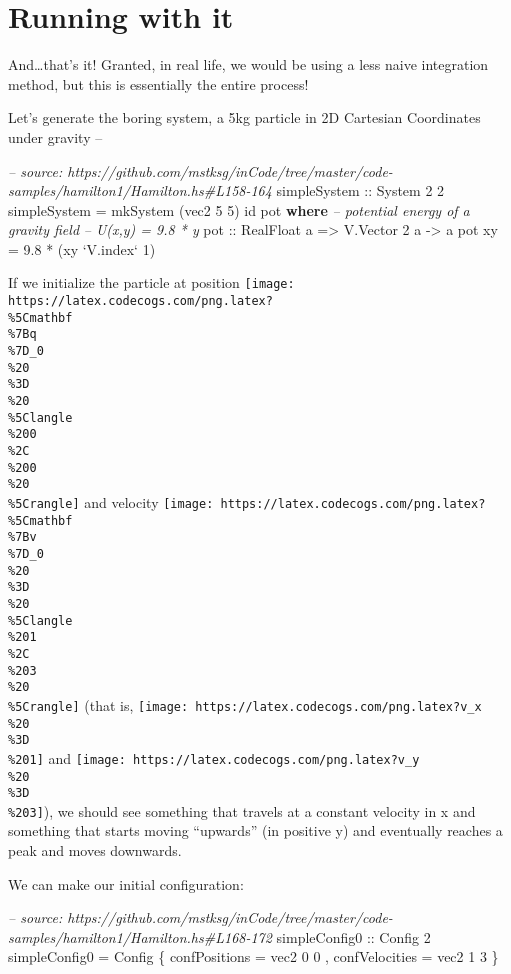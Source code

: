 \documentclass[]{article}
\newenvironment{Shaded}{}{}
\newcommand{\KeywordTok}[1]{\textcolor[rgb]{0.00,0.44,0.13}{\textbf{#1}}}
\newcommand{\DataTypeTok}[1]{\textcolor[rgb]{0.56,0.13,0.00}{#1}}
\newcommand{\DecValTok}[1]{\textcolor[rgb]{0.25,0.63,0.44}{#1}}
\newcommand{\FloatTok}[1]{\textcolor[rgb]{0.25,0.63,0.44}{#1}}
\newcommand{\CommentTok}[1]{\textcolor[rgb]{0.38,0.63,0.69}{\textit{#1}}}
\newcommand{\OtherTok}[1]{\textcolor[rgb]{0.00,0.44,0.13}{#1}}
\newcommand{\FunctionTok}[1]{\textcolor[rgb]{0.02,0.16,0.49}{#1}}
\newcommand{\NormalTok}[1]{#1}
\begin{document}
\section{Running with it}\label{running-with-it}

And\ldots{}that's it! Granted, in real life, we would be using a less naive
integration method, but this is essentially the entire process!

Let's generate the boring system, a 5kg particle in 2D Cartesian Coordinates
under gravity --

\begin{Shaded}
\begin{Highlighting}[]
\CommentTok{-- source: https://github.com/mstksg/inCode/tree/master/code-samples/hamilton1/Hamilton.hs#L158-164}
\OtherTok{simpleSystem ::} \DataTypeTok{System} \DecValTok{2} \DecValTok{2}
\NormalTok{simpleSystem }\FunctionTok{=}\NormalTok{ mkSystem (vec2 }\DecValTok{5} \DecValTok{5}\NormalTok{) id pot}
  \KeywordTok{where}
    \CommentTok{-- potential energy of a gravity field}
    \CommentTok{-- U(x,y) = 9.8 * y}
\OtherTok{    pot ::} \DataTypeTok{RealFloat}\NormalTok{ a }\OtherTok{=>} \DataTypeTok{V.Vector} \DecValTok{2}\NormalTok{ a }\OtherTok{->}\NormalTok{ a}
\NormalTok{    pot xy }\FunctionTok{=} \FloatTok{9.8} \FunctionTok{*}\NormalTok{ (xy }\OtherTok{`V.index`} \DecValTok{1}\NormalTok{)}
\end{Highlighting}
\end{Shaded}

If we initialize the particle at position
\texttt{[image: https://latex.codecogs.com/png.latex?\\\%5Cmathbf\\\%7Bq\\\%7D\_0\\\%20\\\%3D\\\%20\\\%5Clangle\\\%200\\\%2C\\\%200\\\%20\\\%5Crangle]}
and velocity
\texttt{[image: https://latex.codecogs.com/png.latex?\\\%5Cmathbf\\\%7Bv\\\%7D\_0\\\%20\\\%3D\\\%20\\\%5Clangle\\\%201\\\%2C\\\%203\\\%20\\\%5Crangle]}
(that is,
\texttt{[image: https://latex.codecogs.com/png.latex?v\_x\\\%20\\\%3D\\\%201]} and
\texttt{[image: https://latex.codecogs.com/png.latex?v\_y\\\%20\\\%3D\\\%203]}), we
should see something that travels at a constant velocity in x and something that
starts moving ``upwards'' (in positive y) and eventually reaches a peak and
moves downwards.

We can make our initial configuration:

\begin{Shaded}
\begin{Highlighting}[]
\CommentTok{-- source: https://github.com/mstksg/inCode/tree/master/code-samples/hamilton1/Hamilton.hs#L168-172}
\OtherTok{simpleConfig0 ::} \DataTypeTok{Config} \DecValTok{2}
\NormalTok{simpleConfig0 }\FunctionTok{=} \DataTypeTok{Config}
\NormalTok{    \{ confPositions  }\FunctionTok{=}\NormalTok{ vec2 }\DecValTok{0} \DecValTok{0}
\NormalTok{    , confVelocities }\FunctionTok{=}\NormalTok{ vec2 }\DecValTok{1} \DecValTok{3}
\NormalTok{    \}}
\end{Highlighting}
\end{Shaded}
\end{document}
